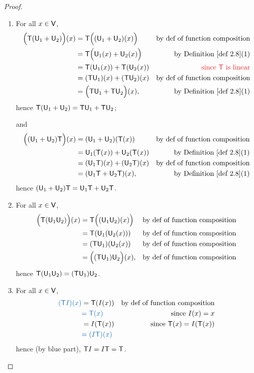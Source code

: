 \begin{proof} \ 

\begin{enumerate}
\item For all \(x \in \textsf{V}\),
\begin{align*}
    \Big( \T(\U_1 + \U_2) \Big)(x) & = \T \Big( (\U_1 + \U_2)(x) \Big) & \text{by def of function composition} \\
                                   & = \T\Big( \U_1(x) + \U_2(x) \Big) & \text{by \DEF{2.8}(1)} \\
                                   & = \T(\U_1(x)) + \T(\U_2(x)) & \text{\RED{since \(\T\) is linear}} \\
                                   & = (\T\U_1)(x) + (\T\U_2)(x) & \text{by def of function composition} \\
                                   & = \Big( \T\U_1 + \T\U_2 \Big)(x), & \text{by \DEF{2.8}(1)}
\end{align*}
hence \(\textsf{T}(\textsf{U}_1 + \textsf{U}_2) = \textsf{T}\textsf{U}_1 + \textsf{T}\textsf{U}_2\);

and
\begin{align*}
    \Big( (\U_1 + \U_2)\T \Big)(x) & = (\U_1 + \U_2)(\T(x)) & \text{by def of function composition} \\
                                   & = \U_1(\T(x)) + \U_2(\T(x)) & \text{by \DEF{2.8}(1)} \\
                                   & = (\U_1\T)(x) + (\U_2\T)(x) & \text{by def of function composition} \\
                                   & = (\U_1\T + \U_2\T)(x), & \text{by \DEF{2.8}(1)}
\end{align*}
hence \((\textsf{U}_1 + \textsf{U}_2)\textsf{T} = \textsf{U}_1\textsf{T} + \textsf{U}_2\textsf{T}\).

\item For all \(x \in \textsf{V}\),
\begin{align*}
    \Big( \textsf{T}(\textsf{U}_1\textsf{U}_2) \Big)(x) & = \textsf{T} \Big((\textsf{U}_1\textsf{U}_2)(x) \Big) & \text{by def of function composition} \\
                                & = \textsf{T}(\textsf{U}_1(\textsf{U}_2(x))) & \text{by def of function composition} \\
                                & = (\textsf{T}\textsf{U}_1)(\textsf{U}_2(x)) & \text{by def of function composition} \\
                                & = \Big( (\textsf{T}\textsf{U}_1)\textsf{U}_2 \Big)(x), & \text{by def of function composition}
\end{align*}
hence \(\textsf{T}(\textsf{U}_1\textsf{U}_2) = (\textsf{T}\textsf{U}_1)\textsf{U}_2\).

\item For all \(x \in \textsf{V}\),
\begin{align*}
    \BLUE{(\T I)(x)} & = \T(I(x)) & \text{by def of function composition} \\
                     & \BLUE{= \T(x)} & \text{since \(I(x) = x\)} \\
                     & = I(\T(x)) & \text{since \(\T(x) = I(\T(x))\)} \\
                     & \BLUE{= (I\T)(x)}
\end{align*}
hence (by blue part), \(\textsf{T} I = I \textsf{T} = \textsf{T}\).


\end{enumerate}
\end{proof}
